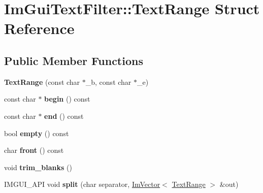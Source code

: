 \hypertarget{struct_im_gui_text_filter_1_1_text_range}{}\section{Im\+Gui\+Text\+Filter\+:\+:Text\+Range Struct Reference}
\label{struct_im_gui_text_filter_1_1_text_range}
\subsection*{Public Member Functions}
\begin{DoxyCompactItemize}
\item 
\mbox{\label{struct_im_gui_text_filter_1_1_text_range_a4a2b377d4fd141fc3664378041f9f007}} 
{\bfseries Text\+Range} (const char $\ast$\+\_\+b, const char $\ast$\+\_\+e)
\item 
\mbox{\label{struct_im_gui_text_filter_1_1_text_range_ab6b04c316f081e8ad7b044a8afbda63c}} 
const char $\ast$ {\bfseries begin} () const
\item 
\mbox{\label{struct_im_gui_text_filter_1_1_text_range_aa5d60286f4c35bfdde82219ff079de9e}} 
const char $\ast$ {\bfseries end} () const
\item 
\mbox{\label{struct_im_gui_text_filter_1_1_text_range_ab8d74e3b0ce63997746828e4b8ae3bbf}} 
bool {\bfseries empty} () const
\item 
\mbox{\label{struct_im_gui_text_filter_1_1_text_range_a7d0b405b4db5d33351812b4b3b6e9107}} 
char {\bfseries front} () const
\item 
\mbox{\label{struct_im_gui_text_filter_1_1_text_range_aa3bbd8b17b528f548d73c0936228dc85}} 
void {\bfseries trim\+\_\+blanks} ()
\item 
\mbox{\label{struct_im_gui_text_filter_1_1_text_range_a9e0a0d6079e10128cde4d89c04b8f566}} 
I\+M\+G\+U\+I\+\_\+\+A\+PI void {\bfseries split} (char separator, \hyperlink{class_im_vector}{Im\+Vector}$<$ \hyperlink{struct_im_gui_text_filter_1_1_text_range}{Text\+Range} $>$ \&out)
\end{DoxyCompactItemize}
